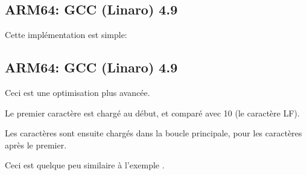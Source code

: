 ﻿\subsection{ARM64: GCC (Linaro) 4.9 \NonOptimizing}

Cette implémentation est simple:



\subsection{ARM64: GCC (Linaro) 4.9 \Optimizing}

Ceci est une optimisation plus avancée.

Le premier caractère est chargé au début, et comparé avec 10 (le caractère \ac{LF}).

Les caractères sont ensuite chargés dans la boucle principale, pour les caractères
après le premier.

Ceci est quelque peu similaire à l'exemple .



